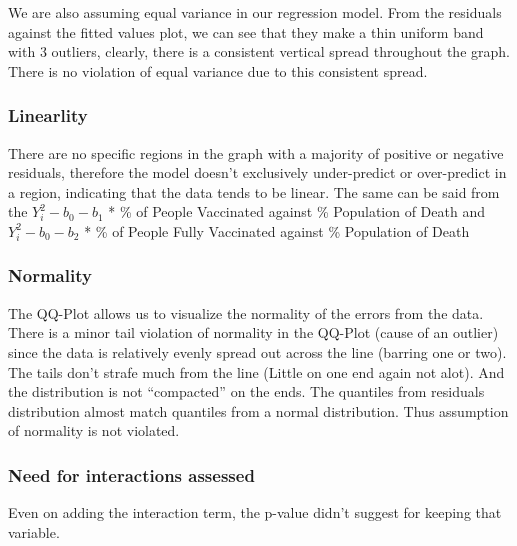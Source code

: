 \documentclass[
  12pt,
]{article}
\begin{document}
We are also assuming equal variance in our regression model. From the
residuals against the fitted values plot, we can see that they make a
thin uniform band with 3 outliers, clearly, there is a consistent
vertical spread throughout the graph. There is no violation of equal
variance due to this consistent spread.

\hypertarget{linearlity-2}{%
\subsubsection{Linearlity}\label{linearlity-2}}

There are no specific regions in the graph with a majority of positive
or negative residuals, therefore the model doesn't exclusively
under-predict or over-predict in a region, indicating that the data
tends to be linear. The same can be said from the \(Y_i^2 - b_0 - b_1\)
* \% of People Vaccinated against \% Population of Death and
\(Y_i^2 - b_0 - b_2\) * \% of People Fully Vaccinated against \%
Population of Death

\hypertarget{normality-2}{%
\subsubsection{Normality}\label{normality-2}}

The QQ-Plot allows us to visualize the normality of the errors from the
data. There is a minor tail violation of normality in the QQ-Plot (cause
of an outlier) since the data is relatively evenly spread out across the
line (barring one or two). The tails don't strafe much from the line
(Little on one end again not alot). And the distribution is not
``compacted'' on the ends. The quantiles from residuals distribution
almost match quantiles from a normal distribution. Thus assumption of
normality is not violated.

\hypertarget{need-for-interactions-assessed-2}{%
\subsubsection{Need for interactions
assessed}\label{need-for-interactions-assessed-2}}

Even on adding the interaction term, the p-value didn't suggest for
keeping that variable.
\end{document}
